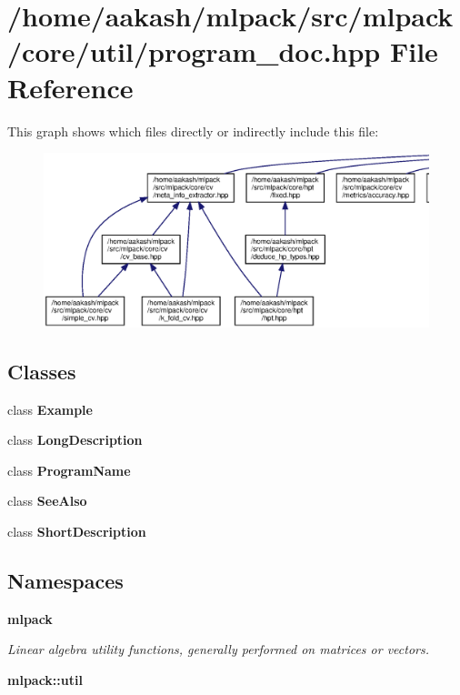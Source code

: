 \section{/home/aakash/mlpack/src/mlpack/core/util/program\+\_\+doc.hpp File Reference}
\label{program__doc_8hpp}
This graph shows which files directly or indirectly include this file\+:
\nopagebreak
\begin{figure}[H]
\begin{center}
\leavevmode
\includegraphics[width=350pt]{program__doc_8hpp__dep__incl}
\end{center}
\end{figure}
\subsection*{Classes}
\begin{DoxyCompactItemize}
\item 
class \textbf{ Example}
\item 
class \textbf{ Long\+Description}
\item 
class \textbf{ Program\+Name}
\item 
class \textbf{ See\+Also}
\item 
class \textbf{ Short\+Description}
\end{DoxyCompactItemize}
\subsection*{Namespaces}
\begin{DoxyCompactItemize}
\item 
 \textbf{ mlpack}
\begin{DoxyCompactList}\small\item\em Linear algebra utility functions, generally performed on matrices or vectors. \end{DoxyCompactList}\item 
 \textbf{ mlpack\+::util}
\end{DoxyCompactItemize}


